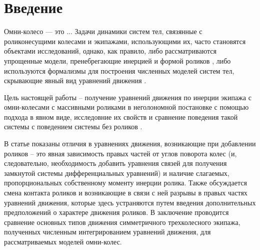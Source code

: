 \section{Введение}

Омни-колесо --- это ...
Задачи динамики систем тел, связянные с роликонесущими колесами и экипажами, использующими их, часто становятся объектами исследований, однако, как правило, либо рассматриваются упрощенные модели, пренебрегающие инерцией и формой роликов \cite{ZobovaTatarinov, Martynenko, Borisov}, либо используются формализмы для построения численных моделей систем тел, скрывающие явный вид уравнений движения \cite{KosenkoGerasimov, MaybeTobolar, Others}.

Цель настоящей работы -- получение уравнений движения по инерции экипажа с омни-колесами с массивными роликами в неголономной постановке с помощью подхода \cite{Tatarinov} в явном виде, исследовние их свойств и сравнение поведения такой системы с поведением системы без роликов \cite{Zobova2011}.



В статье показаны отличия в уравнениях движения, возникающие при добавлении роликов -- это явная зависимость правых частей от углов поворота колес (и, следовательно, необходимость добавить уравнения связей для получения замкнутой системы дифференциальных уравнений) и наличие слагаемых, пропорциональных собственному моменту инерции ролика. Также обсуждается смена контакта роликов и возникающие в связи с ней разрывы в правых частях уравнений движения, которые здесь устраняются путем введения дополнительных предположений о характере движения роликов. В заключение проводится сравнение основных типов движения симметричного трехколесного экипажа, полученных численным интегрированием уравнений движения, для рассматриваемых моделей омни-колес.


